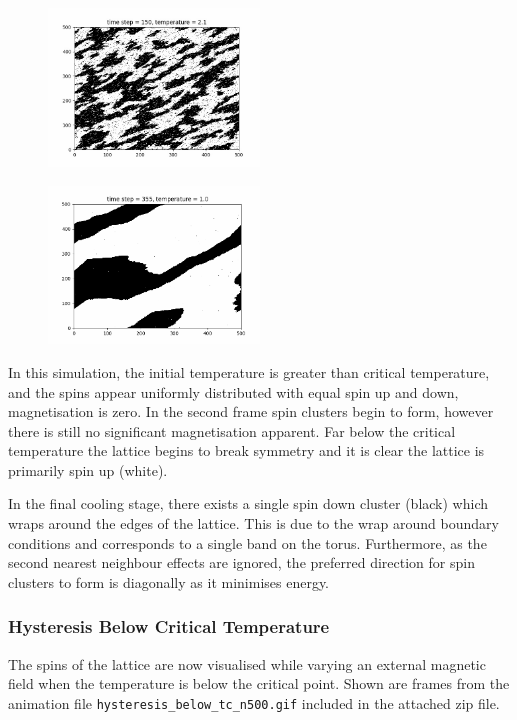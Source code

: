 \documentclass[a4paper, 12pt]{article}
\begin{document}
\begin{figure}[H]
	\centering
	\includegraphics[width=0.5\textwidth]{./resources/frames/cooling_spins_2.jpg}
\end{figure}

\begin{figure}[H]
	\centering
	\includegraphics[width=0.5\textwidth]{./resources/frames/cooling_spins_3.png}
\end{figure}


In this simulation, the initial temperature is greater than critical temperature, and the spins appear uniformly distributed with equal spin up and down, magnetisation is zero. In the second frame spin clusters begin to form, however there is still no significant magnetisation apparent. Far below the critical temperature the lattice begins to break symmetry and it is clear the lattice is primarily spin up (white). 

In the final cooling stage, there exists a single spin down cluster (black) which wraps around the edges of the lattice. This is due to the wrap around boundary conditions and corresponds to a single band on the torus. Furthermore, as the second nearest neighbour effects are ignored, the preferred direction for spin clusters to form is diagonally as it minimises energy.

\newpage
\subsubsection{Hysteresis Below Critical Temperature}
The spins of the lattice are now visualised while varying an external magnetic field when the temperature is below the critical point. Shown are frames from the animation file \verb!hysteresis_below_tc_n500.gif! included in the attached zip file.
\end{document}
